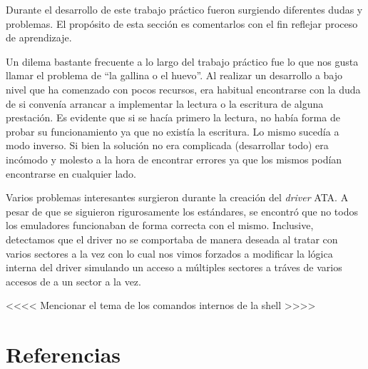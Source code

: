 \documentclass[a4paper,10pt]{article}
\begin{document}
Durante el desarrollo de este trabajo práctico fueron surgiendo diferentes dudas y problemas. El propósito de esta
sección es comentarlos con el fin reflejar proceso de aprendizaje.

Un dilema bastante frecuente a lo largo del trabajo práctico fue lo que nos gusta llamar el problema de ``la gallina o el huevo''. Al realizar
un desarrollo a bajo nivel que ha comenzado con pocos recursos, era habitual encontrarse con la duda de si convenía
arrancar a implementar la lectura o la escritura de alguna prestación. Es evidente que si se hacía primero la lectura, 
no había forma de probar su funcionamiento ya que no existía la escritura. Lo mismo sucedía a modo inverso. Si bien 
la solución no era complicada (desarrollar todo) era incómodo y molesto a la hora de encontrar errores ya que los mismos
podían encontrarse en cualquier lado.

Varios problemas interesantes surgieron durante la creación del \textit{driver} ATA. A pesar de que se siguieron
rigurosamente los estándares, se encontró que no todos los emuladores funcionaban de forma correcta con el mismo.
Inclusive, detectamos que el driver no se comportaba de manera deseada al tratar con varios sectores a la vez con lo
cual nos vimos forzados a modificar la lógica interna del driver simulando un acceso a múltiples sectores a tráves de
varios accesos de a un sector a la vez.


<<<< Mencionar el tema de los comandos internos de la shell >>>>

\newpage     
\section{Referencias}
\end{document}

